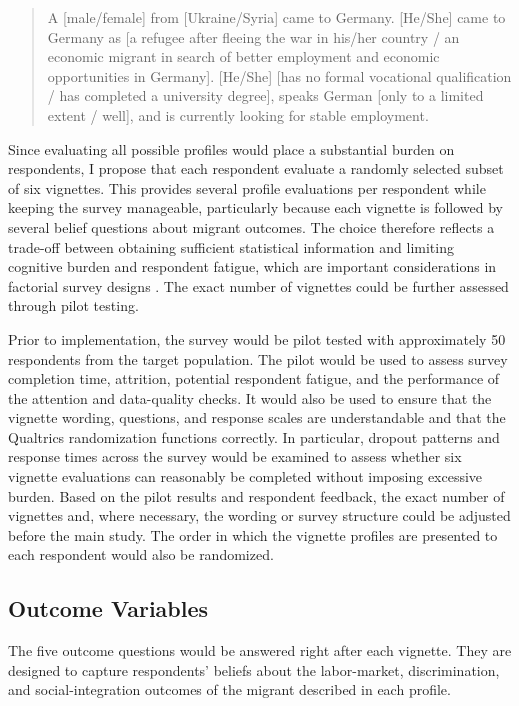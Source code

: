 \begin{quote}
A [male/female] from [Ukraine/Syria] came to Germany. [He/She] came to Germany as
[a refugee after fleeing the war in his/her country / an economic migrant in search of better
employment and economic opportunities in Germany]. [He/She] [has no formal vocational
qualification / has completed a university degree], speaks German [only to a limited extent /
well], and is currently looking for stable employment.
\end{quote}

Since evaluating 
all possible profiles would place a substantial burden on respondents, I propose that each respondent evaluate a 
randomly selected subset of six vignettes. This provides several profile evaluations per respondent while keeping 
the survey manageable, particularly because each vignette is followed by several belief questions about migrant outcomes. 
The choice therefore reflects a trade-off between obtaining sufficient statistical information and limiting 
cognitive burden and respondent fatigue, which are important considerations in factorial survey designs 
\citep{sauer2011application}. The exact number of vignettes could be further assessed through pilot testing.

Prior to implementation, the survey would be pilot tested with approximately 50 respondents from the target population. 
The pilot would be used to assess survey completion time, attrition, potential respondent fatigue, and the performance 
of the attention and data-quality checks. It would also be used to ensure that the vignette wording, questions, and 
response scales are understandable and that the Qualtrics randomization functions correctly. In particular, dropout 
patterns and response times across the survey would be examined to assess whether six vignette evaluations can reasonably 
be completed without imposing excessive burden. Based on the pilot results and respondent feedback, the exact number of 
vignettes and, where necessary, the wording or survey structure could be adjusted before the main study. The order in 
which the vignette profiles are presented to each respondent would also be randomized.

\subsection{Outcome Variables}
The five outcome questions would be answered right after each vignette. They are designed to capture respondents' 
beliefs about the labor-market, discrimination, and social-integration outcomes of the migrant described in each profile.

